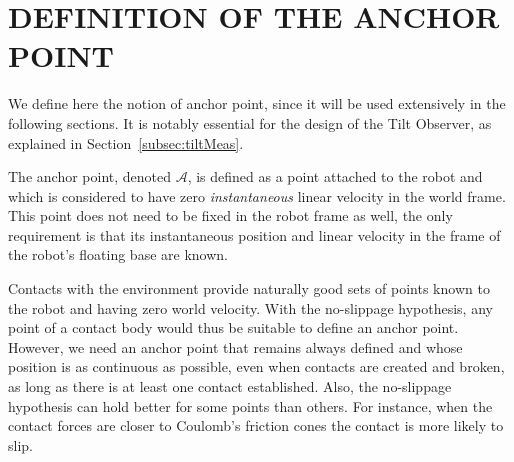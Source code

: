 \documentclass{IJCAS}
\begin{document}
\section{DEFINITION OF THE ANCHOR POINT}\label{sec:anchor_point}
We define here the notion of anchor point, since it will be used extensively in the following sections. It is notably essential for the design of the Tilt Observer, as explained in Section~\ref{subsec:tiltMeas}.

The anchor point, denoted $\mathcal{A}$, is defined as a point attached to the robot and which is considered to have zero \emph{instantaneous} linear velocity in the world frame. This point does not need to be fixed in the robot frame as well, the only requirement is that its instantaneous position and linear velocity in the frame of the robot's floating base are known. 

Contacts with the environment provide naturally good sets of points known to the robot and having zero world velocity. With the no-slippage hypothesis, any point of a contact body would thus be suitable to define an anchor point. However, we need an anchor point that remains always defined and whose position is as continuous as possible, even when contacts are created and broken, as long as there is at least one contact established. Also, the no-slippage hypothesis can hold better for some points than others. For instance, when the contact forces are closer to Coulomb's friction cones the contact is more likely to slip.
\end{document}
